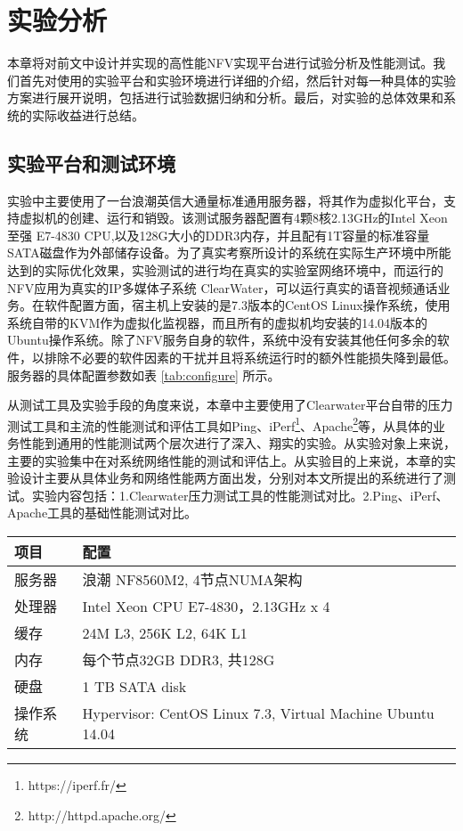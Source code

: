 \chapter{实验分析}
\label{chapter:evaluation}
本章将对前文中设计并实现的高性能NFV实现平台进行试验分析及性能测试。我们首先对使用的实验平台和实验环境进行详细的介绍，然后针对每一种具体的实验方案进行展开说明，包括进行试验数据归纳和分析。最后，对实验的总体效果和系统的实际收益进行总结。

\section{实验平台和测试环境}
实验中主要使用了一台浪潮英信大通量标准通用服务器，将其作为虚拟化平台，支持虚拟机的创建、运行和销毁。该测试服务器配置有4颗8核2.13GHz的Intel Xeon至强 E7-4830 CPU,以及128G大小的DDR3内存，并且配有1T容量的标准容量SATA磁盘作为外部储存设备。为了真实考察所设计的系统在实际生产环境中所能达到的实际优化效果，实验测试的进行均在真实的实验室网络环境中，而运行的NFV应用为真实的IP多媒体子系统 ClearWater，可以运行真实的语音视频通话业务。在软件配置方面，宿主机上安装的是7.3版本的CentOS Linux操作系统，使用系统自带的KVM作为虚拟化监视器，而且所有的虚拟机均安装的14.04版本的Ubuntu操作系统。除了NFV服务自身的软件，系统中没有安装其他任何多余的软件，以排除不必要的软件因素的干扰并且将系统运行时的额外性能损失降到最低。服务器的具体配置参数如表 \ref{tab:configure} 所示。

从测试工具及实验手段的角度来说，本章中主要使用了Clearwater平台自带的压力测试工具和主流的性能测试和评估工具如Ping、iPerf\footnote{https://iperf.fr/}、Apache\footnote{http://httpd.apache.org/}等，从具体的业务性能到通用的性能测试两个层次进行了深入、翔实的实验。从实验对象上来说，主要的实验集中在对系统网络性能的测试和评估上。从实验目的上来说，本章的实验设计主要从具体业务和网络性能两方面出发，分别对本文所提出的系统进行了测试。实验内容包括：1.Clearwater压力测试工具的性能测试对比。2.Ping、iPerf、Apache工具的基础性能测试对比。

\begin{table}[htb]
	\centering
	\begin{tabular}{ | l | p{6cm} |}\hline
		\textbf{项目} &							 \textbf{配置}  				\\ 	\hline
		服务器        &					 浪潮 NF8560M2, 4节点NUMA架构\\ \hline
		处理器 	   &  Intel Xeon CPU E7-4830，2.13GHz x 4  \\ \hline
		缓存    & 24M L3, 256K L2,  64K L1 \\ \hline
		内存 			&  每个节点32GB DDR3,  共128G   \\   \hline
		硬盘     & 				1 TB SATA disk \\ \hline
		操作系统    & Hypervisor: CentOS Linux 7.3,  Virtual Machine Ubuntu 14.04 \\ \hline
	\end{tabular}
\end{table}

